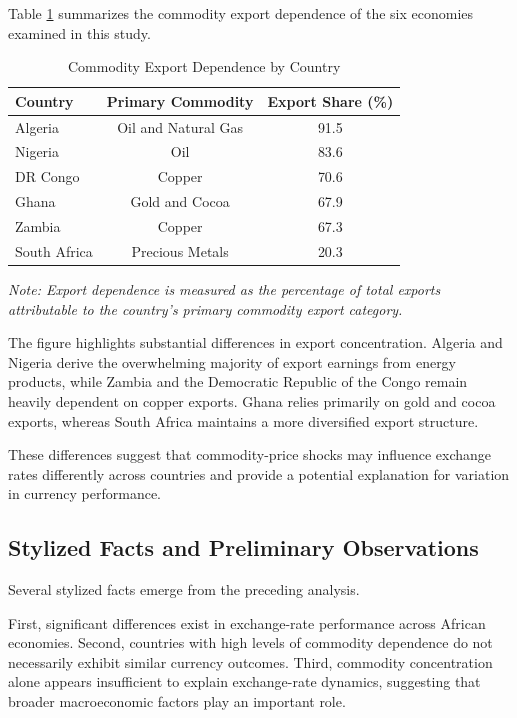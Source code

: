 \documentclass{article}
\begin{document}
Table \ref{tab:export_dependence} summarizes the commodity export dependence of the six economies examined in this study.

\begin{table}[H]
\centering
\caption{Commodity Export Dependence by Country}
\label{tab:export_dependence}
\begin{tabular}{lcc}
\toprule
Country & Primary Commodity & Export Share (\%) \\
\midrule
Algeria      & Oil and Natural Gas & 91.5 \\
Nigeria      & Oil                 & 83.6 \\
DR Congo     & Copper              & 70.6 \\
Ghana        & Gold and Cocoa      & 67.9 \\
Zambia       & Copper              & 67.3 \\
South Africa & Precious Metals     & 20.3 \\
\bottomrule
\end{tabular}
\end{table}


\vspace{0.2cm}


{\footnotesize
\textit{Note: Export dependence is measured as the percentage of total exports attributable to the country's primary commodity export category.}
}



The figure highlights substantial differences in export concentration. Algeria and Nigeria derive the overwhelming majority of export earnings from energy products, while Zambia and the Democratic Republic of the Congo remain heavily dependent on copper exports. Ghana relies primarily on gold and cocoa exports, whereas South Africa maintains a more diversified export structure.

These differences suggest that commodity-price shocks may influence exchange rates differently across countries and provide a potential explanation for variation in currency performance.

\subsection{Stylized Facts and Preliminary Observations}

Several stylized facts emerge from the preceding analysis.

First, significant differences exist in exchange-rate performance across African economies. Second, countries with high levels of commodity dependence do not necessarily exhibit similar currency outcomes. Third, commodity concentration alone appears insufficient to explain exchange-rate dynamics, suggesting that broader macroeconomic factors play an important role.
\end{document}
